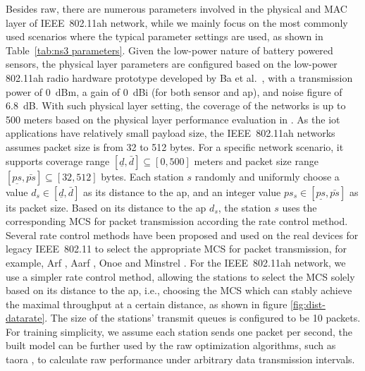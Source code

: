 Besides \gls{raw}, there are numerous parameters involved in the physical and MAC layer of IEEE~802.11ah network, while we mainly focus on the most commonly used scenarios where the typical parameter settings are used, as shown in Table~\ref{tab:ns3 parameters}. Given the low-power nature of battery powered sensors, the physical layer parameters are configured based on the low-power 802.11ah radio hardware prototype developed by Ba et al.~\cite{Ba2016}, with a transmission power of 0~dBm, a gain of 0~dBi (for both sensor and \gls{ap}), and noise figure of 6.8~dB. With such physical layer setting, the coverage of the networks is up to 500 meters based on the physical layer performance evaluation in \cite{bellekens2017outdoor}. As the \gls{iot} applications have relatively small payload size, the IEEE~802.11ah networks assumes packet size is from 32 to 512 bytes. For a specific network scenario, it supports coverage range $[\underline{d}, \bar{d}]  \subseteq [0, 500] $  meters and packet size range $[\underline{ps}, \bar{ps}] \subseteq [32, 512] $ bytes. Each station $s$ randomly and uniformly choose a value $d_s \in [\underline{d}, \bar{d}]$ as its distance to the \gls{ap}, and an integer value $ps_s \in [\underline{ps}, \bar{ps}]$ as its packet size. Based on its distance to the \gls{ap} $d_s$, the station $s$ uses the corresponding MCS for packet transmission according the rate control method. Several rate control methods have been proposed and used on the real devices for legacy IEEE~802.11 to select the appropriate MCS for packet transmission, for example, Arf \cite{arf1997},  Aarf \cite{aarf2004}, Onoe \cite{Onoe} and Minstrel \cite{minstrel}. For the IEEE~802.11ah network, we use a simpler rate control method, allowing the stations to select the MCS solely based on its distance to the \gls{ap}, i.e., choosing the MCS which can stably achieve the maximal throughput at a certain distance, as shown in figure \ref{fig:dist-datarate}. The size of the stations' transmit queues is configured to be 10 packets. For training simplicity, we assume each station sends one packet per second, the built model can be further used by the \gls{raw} optimization algorithms, such as \gls{taora} \cite{Sensor2017,Sensys2017},  to calculate \gls{raw} performance under arbitrary data transmission intervals.




